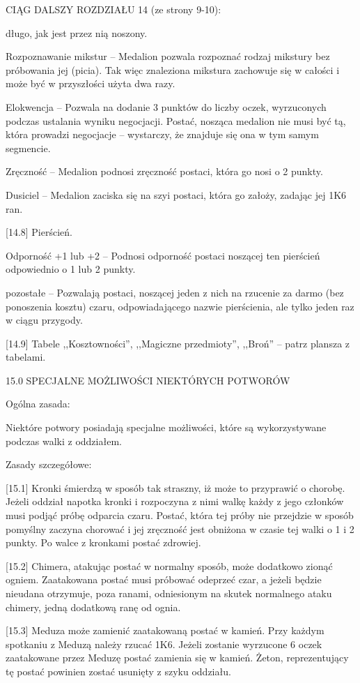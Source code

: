 CIĄG DALSZY ROZDZIAŁU 14 (ze strony 9-10):

długo, jak jest przez nią noszony.

Rozpoznawanie mikstur – Medalion pozwala rozpoznać rodzaj mikstury bez próbowania jej (picia).
Tak więc znaleziona mikstura zachowuje się w całości i może być w przyszłości użyta dwa razy.

Elokwencja – Pozwala na dodanie 3 punktów do liczby oczek, wyrzuconych podczas ustalania wyniku negocjacji.
Postać, nosząca medalion nie musi być tą, która prowadzi negocjacje – wystarczy, że znajduje się ona w tym samym segmencie.

Zręczność – Medalion podnosi zręczność postaci, która go nosi o 2 punkty.

Dusiciel – Medalion zaciska się na szyi postaci, która go założy, zadając jej 1K6 ran.

[14.8] Pierścień.

Odporność +1 lub +2 – Podnosi odporność postaci noszącej ten pierścień odpowiednio o 1 lub 2 punkty.

pozostałe – Pozwalają postaci, noszącej jeden z nich na rzucenie za darmo (bez ponoszenia kosztu) czaru, odpowiadającego nazwie pierścienia, ale tylko jeden raz w ciągu przygody.

[14.9] Tabele ,,Kosztowności'', ,,Magiczne przedmioty'', ,,Broń'' – patrz plansza z tabelami.

15.0 SPECJALNE MOŻLIWOŚCI NIEKTÓRYCH POTWORÓW

Ogólna zasada:

Niektóre potwory posiadają specjalne możliwości, które są wykorzystywane podczas walki z oddziałem.

Zasady szczegółowe:

[15.1] Kronki śmierdzą w sposób tak straszny, iż może to przyprawić o chorobę.
Jeżeli oddział napotka kronki i rozpoczyna z nimi walkę każdy z jego członków musi podjąć próbę odparcia czaru.
Postać, która tej próby nie przejdzie w sposób pomyślny zaczyna chorować i jej zręczność jest obniżona w czasie tej walki o 1 i 2 punkty.
Po walce z kronkami postać zdrowiej.

[15.2] Chimera, atakując postać w normalny sposób, może dodatkowo zionąć ogniem.
Zaatakowana postać musi próbować odeprzeć czar, a jeżeli będzie nieudana otrzymuje, poza ranami, odniesionym na skutek normalnego ataku chimery, jedną dodatkową ranę od ognia.

[15.3] Meduza może zamienić zaatakowaną postać w kamień.
Przy każdym spotkaniu z Meduzą należy rzucać 1K6.
Jeżeli zostanie wyrzucone 6 oczek zaatakowane przez Meduzę postać zamienia się w kamień.
Żeton, reprezentujący tę postać powinien zostać usunięty z szyku oddziału.

